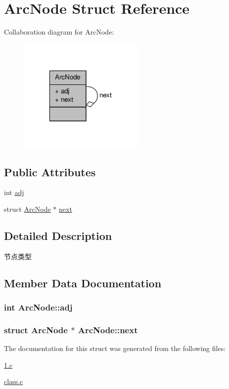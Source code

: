 \hypertarget{struct_arc_node}{\section{\-Arc\-Node \-Struct \-Reference}
\label{struct_arc_node}
}


\-Collaboration diagram for \-Arc\-Node\-:
\nopagebreak
\begin{figure}[H]
\begin{center}
\leavevmode
\includegraphics[width=174pt]{struct_arc_node__coll__graph}
\end{center}
\end{figure}
\subsection*{\-Public \-Attributes}
\begin{DoxyCompactItemize}
\item 
int \hyperlink{struct_arc_node_a730d4d609097f6757096f0a2c0ec6a01}{adj}
\item 
struct \hyperlink{struct_arc_node}{\-Arc\-Node} $\ast$ \hyperlink{struct_arc_node_ac3a194e48c20cce78e205f6f9f3493bd}{next}
\end{DoxyCompactItemize}


\subsection{\-Detailed \-Description}
节点类型 

\subsection{\-Member \-Data \-Documentation}
\hypertarget{struct_arc_node_a730d4d609097f6757096f0a2c0ec6a01}{
\subsubsection[{adj}]{\setlength{\rightskip}{0pt plus 5cm}int {\bf \-Arc\-Node\-::adj}}}\label{struct_arc_node_a730d4d609097f6757096f0a2c0ec6a01}
\hypertarget{struct_arc_node_ac3a194e48c20cce78e205f6f9f3493bd}{
\subsubsection[{next}]{\setlength{\rightskip}{0pt plus 5cm}struct {\bf \-Arc\-Node} $\ast$ {\bf \-Arc\-Node\-::next}}}\label{struct_arc_node_ac3a194e48c20cce78e205f6f9f3493bd}


\-The documentation for this struct was generated from the following files\-:\begin{DoxyCompactItemize}
\item 
\hyperlink{1_8c}{1.\-c}\item 
\hyperlink{class_8c}{class.\-c}\end{DoxyCompactItemize}
